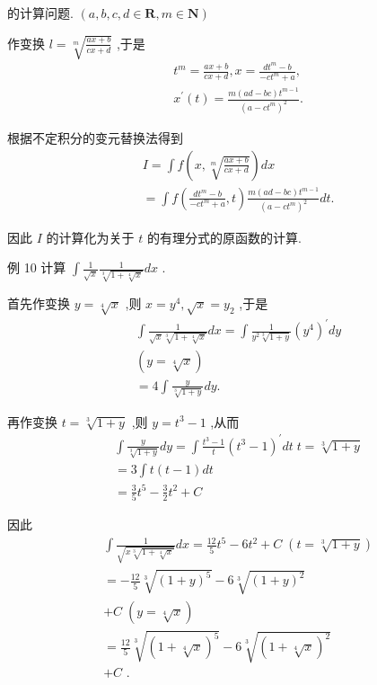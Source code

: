 的计算问题. $\left( {a,b,c,d \in  \mathbf{R},m \in  \mathbf{N}}\right)$

作变换 $l = \sqrt[m]{\frac{{ax} + b}{{cx} + d}}$ ,于是
\begin{align*}
	&{t}^{m} = \frac{{ax} + b}{{cx} + d},x = \frac{d{t}^{m} - b}{-c{t}^{m} + a},\\
	&{x}^{\prime }\left( t\right)  = \frac{m\left( {{ad} - {bc}}\right) {t}^{m - 1}}{{\left( a - c{t}^{m}\right) }^{2}}.
\end{align*}

根据不定积分的变元替换法得到
\begin{align*}
	&I = \int f\left( {x,\sqrt[m]{\frac{{ax} + b}{{cx} + d}}}\right) {dx}\\
	&= \int f\left( {\frac{d{t}^{m} - b}{-c{t}^{m} + a},t}\right) \frac{m\left( {{ad} - {bc}}\right) {t}^{m - 1}}{{\left( a - c{t}^{m}\right) }^{2}}{dt}.
\end{align*}

因此 $I$ 的计算化为关于 $t$ 的有理分式的原函数的计算.

例 10 计算 $\int \frac{1}{\sqrt{x}}\frac{1}{\sqrt[3]{1 + \sqrt[4]{x}}}{dx}$ .

首先作变换 $y = \sqrt[4]{x}$ ,则 $x = {y}^{4},\sqrt{x} = {y}_{2}$ ,于是
\begin{align*}
	&\int \frac{1}{\sqrt{x}\sqrt[3]{1 + \sqrt[4]{x}}}{dx} = \int \frac{1}{{y}^{2}\sqrt[3]{1 + y}}{\left( {y}^{4}\right) }^{\prime }{dy}\\
	&\left( {y = \sqrt[4]{x}}\right)\\
	&= 4\int \frac{y}{\sqrt[3]{1 + y}}{dy}.
\end{align*}

再作变换 $t = \sqrt[3]{1 + y}$ ,则 $y = {t}^{3} - 1$ ,从而
\begin{align*}
	&\int \frac{y}{\sqrt[3]{1 + y}}{dy} = \int \frac{{t}^{3} - 1}{t}{\left( {t}^{3} - 1\right) }^{\prime }{dt}\;t = \sqrt[3]{1 + y}\\
	&= 3\int t\left( {t - 1}\right) {dt}\\
	&= \frac{3}{5}{t}^{5} - \frac{3}{2}{t}^{2} + C
\end{align*}

因此
\begin{align*}
	&\int \frac{1}{\sqrt{x\sqrt[3]{1 + \sqrt[4]{x}}}}{dx} = \frac{12}{5}{t}^{5} - 6{t}^{2} + C\;\left( {t = \sqrt[3]{1 + y}}\right)\\
	&=  - \frac{12}{5}\sqrt[3]{{\left( 1 + y\right) }^{5}} - 6\sqrt[3]{{\left( 1 + y\right) }^{2}}\\
	&+ C\;\left( {y = \sqrt[4]{x}}\right)\\
	&= \frac{12}{5}\sqrt[3]{{\left( 1 + \sqrt[4]{x}\right) }^{5}} - 6\sqrt[3]{{\left( 1 + \sqrt[4]{x}\right) }^{2}}\\
	&+ C\text{ . }
\end{align*}

